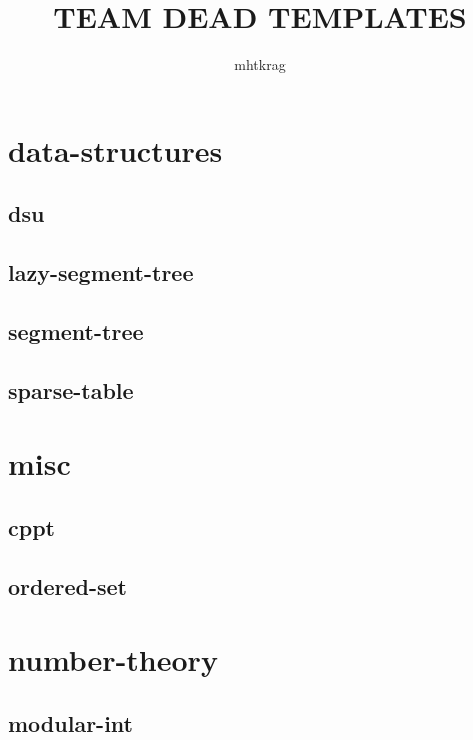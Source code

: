 \documentclass[a4paper, twocolumn]{article}
\title{TEAM DEAD TEMPLATES}
\author{mhtkrag}
\begin{document}
\begin{titlepage}
\maketitle
\thispagestyle{empty}
\pagebreak
\pagestyle{fancy}
\lhead{}
\rhead{}
\cfoot{}
\tableofcontents
\end{titlepage}

\pagestyle{fancy}
\cfoot{- \thepage \ -}
  
\section{data-structures}
\subsection{dsu}

\subsection{lazy-segment-tree}

\subsection{segment-tree}

\subsection{sparse-table}

\section{misc}
\subsection{cppt}

\subsection{ordered-set}

\section{number-theory}
\subsection{modular-int}

\end{document}
